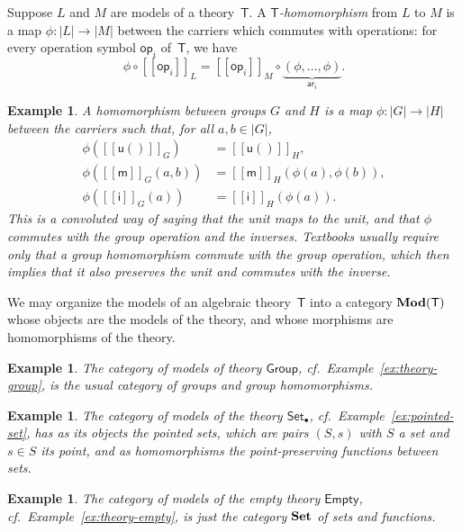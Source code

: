 \documentclass{amsart}
\newcommand{\theory}[1]{\mathsf{#1}} %
\newcommand{\Mod}[1]{\text{\textbf{Mod}}(\theory{#1})} %
\newcommand{\category}[1]{\text{\textbf{#1}}} %
\newcommand{\carrier}[1]{|#1|} %
\newcommand{\op}[1]{\mathsf{op}_{#1}} %
\newcommand{\arity}[1]{\mathsf{ar}_{#1}} %
\newcommand{\sem}[1]{[\![#1]\!]} %
\newtheorem{example}[definition]{Example}
\begin{document}
Suppose $L$ and $M$ are models of a theory~$\theory{T}$. A
\emph{$\theory{T}$-homomorphism} from $L$ to $M$ is a map $\phi : \carrier{L} \to \carrier{M}$ between the
carriers which commutes with operations: for every operation symbol $\op{i}$
of~$\theory{T}$, we have
%
\begin{equation*}
  \phi \circ \sem{\op{i}}_L = \sem{\op{i}}_M \circ \underbrace{(\phi, \ldots, \phi)}_{\arity{i}}.
\end{equation*}

\begin{example}
  A homomorphism between groups $G$ and $H$ is a map $\phi : \carrier{G} \to \carrier{H}$ between the
  carriers such that, for all $a, b \in \carrier{G}$,
  \begin{align*}
    \phi(\sem{\mathsf{u}()}_G) &= \sem{\mathsf{u}()}_H,\\
    \phi(\sem{\mathsf{m}}_G (a,b)) &= \sem{\mathsf{m}}_H (\phi(a), \phi(b)),\\
    \phi(\sem{\mathsf{i}}_G (a)) &= \sem{\mathsf{i}}_H (\phi(a)).
  \end{align*}
  This is a convoluted way of saying that the unit maps to the unit, and that $\phi$
  commutes with the group operation and the inverses. Textbooks usually require only that
  a group homomorphism commute with the group operation, which then implies that it also
  preserves the unit and commutes with the inverse.
\end{example}

We may organize the models of an algebraic theory~$\theory{T}$ into a category $\Mod{T}$
whose objects are the models of the theory, and whose morphisms are homomorphisms of the
theory.

\begin{example}
  The category of models of theory $\theory{Group}$, cf.\ Example~\ref{ex:theory-group},
  is the usual category of groups and group homomorphisms.
\end{example}

\begin{example}
  The category of models of the theory $\theory{Set_\bullet}$, cf.\
  Example~\ref{ex:pointed-set}, has as its objects the pointed sets, which are pairs
  $(S, s)$ with $S$ a set and $s \in S$ its \emph{point}, and as homomorphisms
  the point-preserving functions between sets.
\end{example}

\begin{example}
  The category of models of the empty theory $\theory{Empty}$, cf.\
  Example~\ref{ex:theory-empty}, is just the category $\category{Set}$ of sets and
  functions.
\end{example}
\end{document}
